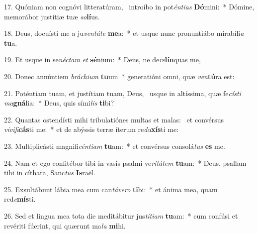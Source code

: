 17. Quóniam non cognóvi litteratúram, \dag\  introíbo in pot\textit{én}\textit{ti}\textit{as} \textbf{Dó}mini:~*  Dómine, memorábor justítiæ tuæ \textit{so}\textbf{lí}us.\

18. Deus, docuísti me a ju\textit{ven}\textit{tú}\textit{te} \textbf{me}a:~*  et usque nunc pronuntiábo mirabíli\textit{a} \textbf{tu}a.\

19. Et usque in se\textit{néc}\textit{tam} \textit{et} \textbf{sé}nium:~*  Deus, ne de\textit{re}\textbf{lín}quas me,\

20. Donec annúntiem \textit{brá}\textit{chi}\textit{um} \textbf{tu}um~*  generatióni omni, quæ \textit{ven}\textbf{tú}ra est:\

21. Poténtiam tuam, et justítiam tuam, Deus, \dag\  usque in altíssima, quæ fe\textit{cís}\textit{ti} \textit{ma}\textbf{gná}lia:~*  Deus, quis sími\textit{lis} \textbf{ti}bi?\

22. Quantas ostendísti mihi tribulatiónes multas et malas: \dag\  et convérsus \textit{vi}\textit{vi}\textit{fi}\textbf{cás}ti me:~*  et de abýssis terræ íterum re\textit{du}\textbf{xís}ti me:\

23. Multiplicásti magnifi\textit{cén}\textit{ti}\textit{am} \textbf{tu}am:~*  et convérsus consolá\textit{tus} \textbf{es} me.\

24. Nam et ego confitébor tibi in vasis psalmi ve\textit{ri}\textit{tá}\textit{tem} \textbf{tu}am:~*  Deus, psallam tibi in cíthara, Sanc\textit{tus} \textbf{Is}raël.\

25. Exsultábunt lábia mea cum can\textit{tá}\textit{ve}\textit{ro} \textbf{ti}bi:~*  et ánima mea, quam red\textit{e}\textbf{mís}ti.\

26. Sed et lingua mea tota die meditábitur jus\textit{tí}\textit{ti}\textit{am} \textbf{tu}am:~*  cum confúsi et revériti fúerint, qui quærunt ma\textit{la} \textbf{mi}hi.\

